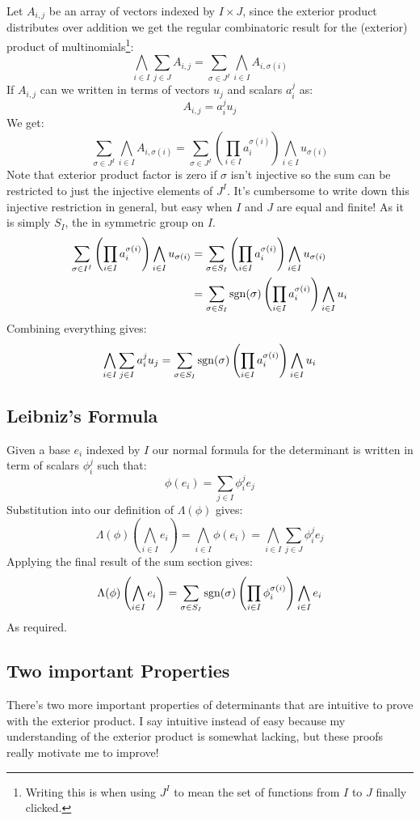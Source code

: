 Let $A_{i,j}$ be an array of vectors indexed by $I\times J$,
since the exterior product distributes over addition we get the regular combinatoric result for the (exterior) product of multinomials\footnote{Writing this is when using $J^I$ to mean the set of functions from $I$ to $J$ finally clicked.}:
\[\bigwedge_{i\in I}\sum_{j\in J} A_{i,j} = \sum_{\sigma\in J^I}\bigwedge_{i\in I}A_{i,\sigma(i)}\]
If $A_{i,j}$ can we written in terms of vectors $u_j$ and scalars $a_i^j$ as: 
\[A_{i,j} = a_i^ju_j\]
We get:
\[ \sum_{\sigma\in J^I}\bigwedge_{i\in I}A_{i,\sigma(i)} = \sum_{\sigma\in J^I}\left(\prod_{i\in I}a_i^{\sigma(i)}\right)\bigwedge_{i\in I}u_{\sigma(i)}\]
Note that exterior product factor is zero if $\sigma$ isn't injective so the sum can be restricted to just the injective elements of $J^I$.
It's cumbersome to write down this injective restriction in general,
but easy when $I$ and $J$ are equal and finite!
As it is simply $S_I$,
the in symmetric group on $I$.
\[\begin{aligned} 
	\sum_{\sigma\in I^I}\left(\prod_{i\in I}a_i^{\sigma(i)}\right)\bigwedge_{i\in I}u_{\sigma(i)}
	&= \sum_{\sigma\in S_I}\left(\prod_{i\in I}a_i^{\sigma(i)}\right)\bigwedge_{i\in I}u_{\sigma(i)}\\
	&= \sum_{\sigma\in S_I}\operatorname{sgn}(\sigma)\left(\prod_{i\in I}a_i^{\sigma(i)}\right)\bigwedge_{i\in I}u_{i}\\
\end{aligned}\]
Combining everything gives:
\[\bigwedge_{i\in I}\sum_{j\in I} a_i^ju_j= \sum_{\sigma\in S_I}\operatorname{sgn}(\sigma)\left(\prod_{i\in I}a_i^{\sigma(i)}\right)\bigwedge_{i\in I}u_{i}\]

\subsection{Leibniz's Formula}
Given a base $e_i$ indexed by $I$ our normal formula for the determinant is written in term of scalars $\phi_i^j$ such that:
\[\phi(e_i) = \sum_{j\in I}\phi_i^je_j\]
Substitution into our definition of $\Lambda(\phi)$ gives:
\[\Lambda(\phi)\left(\bigwedge_{i\in I}e_i\right) = \bigwedge_{i\in I}\phi(e_i) = \bigwedge_{i\in I}\sum_{j\in J}\phi_i^je_j\]
Applying the final result of the sum section gives:
\[\Lambda(\phi)\left(\bigwedge_{i\in I}e_i\right) = \sum_{\sigma\in S_I}\operatorname{sgn}(\sigma)\left(\prod_{i\in I}\phi_i^{\sigma(i)}\right)\bigwedge_{i\in I}e_{i} \]
As required.

\subsection{Two important Properties}
There's two more important properties of determinants that are intuitive to prove with the exterior product.
I say intuitive instead of easy because my understanding of the exterior product is somewhat lacking,
but these proofs really motivate me to improve!

